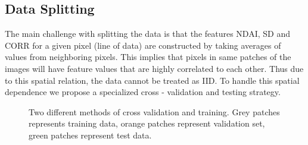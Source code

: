 \documentclass[11pt, letterpaper, journal]{IEEEtran}
\begin{document}
\subsection{Data Splitting}
The main challenge with splitting the data is that the features NDAI, SD and CORR for a given pixel (line of data) are constructed by taking averages of values from neighboring pixels. This implies that pixels in same patches of the images will have feature values that are highly correlated to each other. Thus due to this spatial relation, the data cannot be treated as IID. To handle this spatial dependence we propose a specialized cross - validation and testing strategy. 
\\
\begin{figure}%
    \centering
    \qquad
    \caption{Two different methods of cross validation and training. Grey patches represents training data, orange patches represent validation set, green patches represent test data.}%
    \label{fig:test_schema}%
\end{figure}
\end{document}
